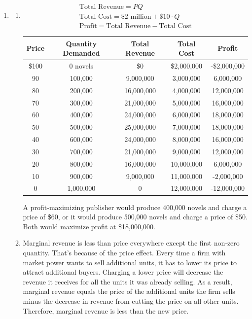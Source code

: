 \documentclass{article}
\begin{document}
\begin{enumerate}

\item \begin{enumerate}
	
	\item \begin{gather*}
		\text{Total Revenue} = PQ \\
		\text{Total Cost} = \$2 \text{ million} + \$10 \cdot Q \\
		\text{Profit} = \text{Total Revenue} - \text{Total Cost}
		\end{gather*}
		\begin{center}
		\begin{tabular}{c | c | c | c | c}
		\textbf{Price} & \textbf{Quantity Demanded} & \textbf{Total Revenue} & \textbf{Total Cost} & \textbf{Profit} \\
		\hline
		\$100 & 0 novels & \$0 & \$2,000,000 & -\$2,000,000 \\
		\hline
		90 & 100,000 & 9,000,000 & 3,000,000 & 6,000,000 \\
		\hline
		80 & 200,000 & 16,000,000 & 4,000,000 & 12,000,000 \\
		\hline
		70 & 300,000 & 21,000,000 & 5,000,000 & 16,000,000 \\
		\hline
		60 & 400,000 & 24,000,000 & 6,000,000 & 18,000,000\\
		\hline
		50 & 500,000 & 25,000,000 & 7,000,000 & 18,000,000 \\
		\hline
		40 & 600,000 & 24,000,000 & 8,000,000 & 16,000,000 \\
		\hline
		30 & 700,000 & 21,000,000 & 9,000,000 & 12,000,000 \\
		\hline
		20 & 800,000 & 16,000,000 & 10,000,000 & 6,000,000 \\
		\hline
		10 & 900,000 & 9,000,000 & 11,000,000 & -2,000,000 \\
		\hline
		0 & 1,000,000 & 0 & 12,000,000 & -12,000,000
		\end{tabular}
		\end{center}
		A profit-maximizing publisher would produce 400,000 novels and charge a price of \$60, or it would produce 500,000 novels and charge a price of \$50. Both would maximize profit at \$18,000,000. 
		
	\item Marginal revenue is less than price everywhere except the first non-zero quantity. That's because of the price effect. Every time a firm with market power wants to sell additional units, it has to lower its price to attract additional buyers. Charging a lower price will decrease the revenue it receives for all the units it was already selling. As a result, marginal revenue equals the price of the additional units the firm sells minus the decrease in revenue from cutting the price on all other units. Therefore, marginal revenue is less than the new price.
	

\end{enumerate}
\end{enumerate}
\end{document}
